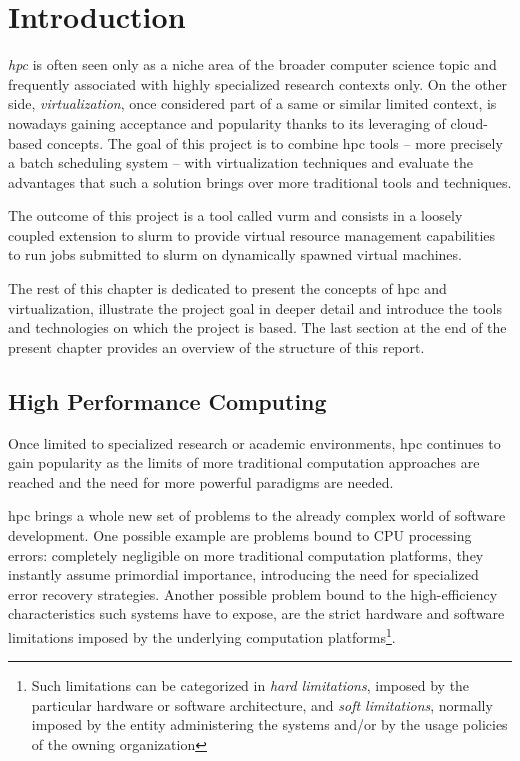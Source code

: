 \chapter{Introduction}
\label{sec:introduction}

\emph{\gls{hpc}} is often seen only as a niche area of the broader computer science topic and frequently associated with highly specialized research contexts only. On the other side, \emph{virtualization}, once considered part of a same or similar limited context, is nowadays gaining acceptance and popularity thanks to its leveraging of cloud-based concepts. The goal of this project is to combine \gls{hpc} tools -- more precisely a batch scheduling system -- with virtualization techniques and evaluate the advantages that such a solution brings over more traditional tools and techniques.

The outcome of this project is a tool called \gls{vurm} and consists in a loosely coupled extension to \gls{slurm} to provide virtual resource management capabilities to run jobs submitted to \gls{slurm} on dynamically spawned virtual machines.

The rest of this chapter is dedicated to present the concepts of \gls{hpc} and virtualization, illustrate the project goal in deeper detail and introduce the tools and technologies on which the project is based. The last section at the end of the present chapter provides an overview of the structure of this report.



\section{High Performance Computing}
\label{sec:hpc}


Once limited to specialized research or academic environments, \gls{hpc} continues to gain popularity as the limits of more traditional computation approaches are reached and the need for more powerful paradigms are needed. 

\gls{hpc} brings a whole new set of problems to the already complex world of software development. One possible example are problems bound to CPU processing errors: completely negligible on more traditional computation platforms, they instantly assume primordial importance, introducing the need for specialized error recovery strategies. Another possible problem bound to the high-efficiency characteristics such systems have to expose, are the strict hardware and software limitations imposed by the underlying computation platforms\footnote{Such limitations can be categorized in \emph{hard limitations}, imposed by the particular hardware or software architecture, and \emph{soft limitations}, normally imposed by the entity administering the systems and/or by the usage policies of the owning organization}.

